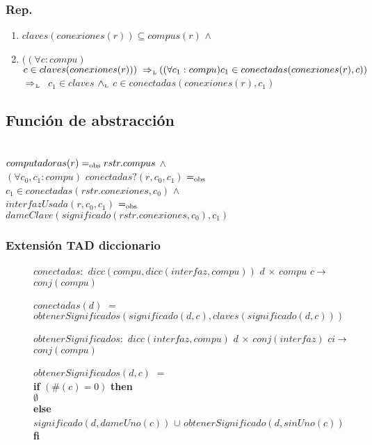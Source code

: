 \subsubsection*{Rep.}
\begin{enumerate}
\item[] $claves(conexiones(r)) \subseteq compus(r)$ $\land$
\item[] $((\forall c : compu)$ $c \in claves(conexiones(r))) \impluego \\
		((\forall c_1 : compu) c_1 \in conectadas(conexiones(r),c))$ $\impluego$ $c_1 \in claves$ $\land_{\mathrm{\scriptscriptstyle{L}}}$ $c \in conectadas(conexiones(r),c_1)$
\end{enumerate}

\subsection{Función de abstracción}

 \\
$computadoras(r) =_{\mathrm{obs}} rstr.compus$ $\land$ \\
$(\forall c_0,c_1:compu)$ $conectadas?(r,c_0,c_1)$ $=_{\mathrm{obs}}$ $c_1 \in conectadas(rstr.conexiones,c_0)$ $\land$\\
$interfazUsada(r,c_0,c_1)$ $=_{\mathrm{obs}}$ $dameClave(significado(rstr.conexiones,c_0),c_1)$

\subsubsection*{Extensión TAD diccionario}
\begin{description} 
\item[] $conectadas:$ $dicc(compu,dicc(interfaz,compu))$ $d$ $\times$ $compu$ $c$ $\!\rightarrow\!$ $conj(compu)$ \setlength{\parindent}{1cm} \indent
\item[] $conectadas(d)$ $=$  $obtenerSignificados(significado(d,c),claves(significado(d,c)))$
\\
\item[] $obtenerSignificados:$ $dicc(interfaz,compu)$ $d$ $\times$ $conj(interfaz)$ $ci$ $\!\rightarrow\!$ $conj(compu)$ \setlength{\parindent}{0.1cm} \indent
\item[] $obtenerSignificados(d,c)$ $=$
	\setlength{\parindent}{1cm}\\ \textbf{if} $(\#(c) = 0)$ \textbf{then}
		\\ \indent$\emptyset$
	\\ \textbf{else} 
		\\\indent  $significado(d,dameUno(c))$ $\cup$ $obtenerSignificado(d,sinUno(c))$
	\\  \textbf{fi} 
\end{description}

